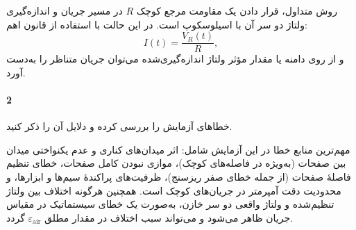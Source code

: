 \documentclass[a4paper, 11pt]{article}
\begin{document}
روش متداول، قرار دادن یک مقاومت مرجع کوچک $R$ در مسیر جریان و اندازه‌گیری ولتاژ دو سر آن با اسیلوسکوپ است. در این حالت با استفاده از قانون اهم:
\[
I(t)=\frac{V_R(t)}{R},
\]
و از روی دامنه یا مقدار مؤثر ولتاژ اندازه‌گیری‌شده می‌توان جریان متناظر را به‌دست آورد.

\paragraph{2}
خطاهای آزمایش را بررسی کرده و دلایل آن را ذکر کنید.

مهم‌ترین منابع خطا در این آزمایش شامل: اثر میدان‌های کناری و عدم یکنواختی میدان بین صفحات (به‌ویژه در فاصله‌های کوچک)، موازی نبودن کامل صفحات، خطای تنظیم فاصلهٔ صفحات (از جمله خطای صفر ریزسنج)، ظرفیت‌های پراکندهٔ سیم‌ها و ابزارها، و محدودیت دقت آمپرمتر در جریان‌های کوچک است. همچنین هرگونه اختلاف بین ولتاژ تنظیم‌شده و ولتاژ واقعی دو سر خازن، به‌صورت یک خطای سیستماتیک در مقیاس جریان ظاهر می‌شود و می‌تواند سبب اختلاف در مقدار مطلق $\varepsilon_{\mathrm{air}}$ گردد.
\end{document}
